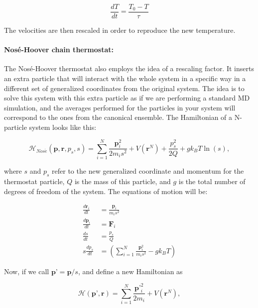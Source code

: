 \documentclass[a4paper,11pt]{article}
\begin{document}
\begin {equation}
 \frac{dT}{dt} = \frac{T_{0}-T}{\tau}
\end{equation}

The velocities are then rescaled in order to reproduce the new
temperature.

\paragraph{Nos\'e-Hoover chain thermostat:}

The Nos\'e-Hoover thermostat also employs the idea of a rescaling
factor. It inserts an extra particle that will interact
with the whole system in a specific way in a different set of
generalized coordinates from the original system. The idea is
to solve this system with this extra particle as if we are
performing a standard MD simulation, and the averages performed
for the particles in your system will correspond to the ones from
the canonical ensemble. The Hamiltonian of a N-particle system looks
like this:

\begin {equation}
 \mathcal{H}_{Nos\acute{e}}(\textbf{p},\textbf{r},p_{s},s) = \sum\limits_{i=1}^N
\frac{\textbf{p}_{i}^2}{2m_{i}s^2} + V(\textbf{r}^N) + \frac{p_{s}^2}{2Q}
+ gk_{B}T\ln(s),
\end{equation}

where $s$ and $p_{s}$ refer to the new generalized coordinate and momentum
for the thermostat particle, $Q$ is the mass of this particle, and $g$ is
the total number of degrees of freedom of the system. The equations of
motion will be:

\begin{align}
 \frac{d\textbf{r}_{i}}{dt} &= \frac{\textbf{p}_{i}}{m_{i}s^2} \\
 \frac{d\textbf{p}_{i}}{dt} &= \textbf{F}_{i} \\
 \frac{ds}{dt} &= \frac{p_{s}}{Q} \\
 s\frac{dp_{s}}{dt} &= \left(\sum_{i=1}^N \frac{\textbf{p}_{i}^2}{m_{i}s^2}
  -gk_{B}T \right)
\end{align}

Now, if we call $\textbf{p'} = \textbf{p}/s$, and define a new Hamiltonian as

\begin {equation}
 \mathcal{H}(\textbf{p'},\textbf{r}) = \sum\limits_{i=1}^N
\frac{\textbf{p'}_{i}^2}{2m_{i}} + V(\textbf{r}^N),
\end{equation}
\end{document}
